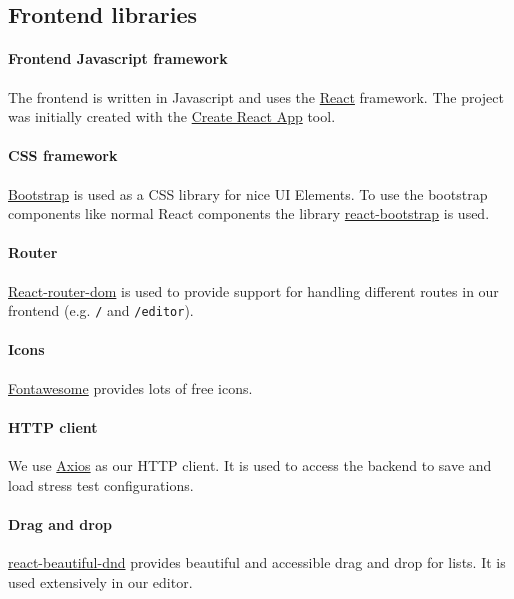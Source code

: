 \subsection{Frontend libraries}

\paragraph{Frontend Javascript framework}
The frontend is written in Javascript and uses the \href{https://reactjs.org}{React} framework.
The project was initially created with the \href{https://create-react-app.dev}{Create React App} tool.

\paragraph{CSS framework}
\href{https://getbootstrap.com}{Bootstrap} is used as a CSS library for nice UI Elements. 
To use the bootstrap components like normal React components the library \href{https://react-bootstrap.github.io}{react-bootstrap} is used.

\paragraph{Router}
\href{https://reacttraining.com/react-router/web/guides/quick-start}{React-router-dom} is used to provide support for handling different routes in our frontend (e.g. \texttt{/} and \texttt{/editor}).

\paragraph{Icons}
\href{https://fontawesome.com}{Fontawesome} provides lots of free icons.

\paragraph{HTTP client}
We use \href{https://github.com/axios/axios}{Axios} as our HTTP client.
It is used to access the backend to save and load stress test configurations.

\paragraph{Drag and drop}
\href{https://github.com/atlassian/react-beautiful-dnd}{react-beautiful-dnd} provides beautiful and accessible drag and drop for lists.
It is used extensively in our editor.

